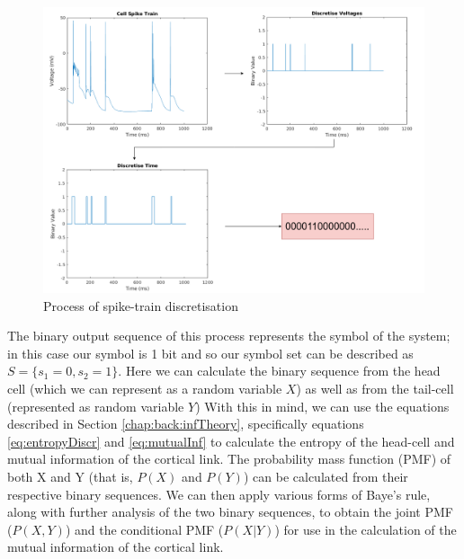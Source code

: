 \begin{figure}[ht]
    \centering
    \includegraphics[width=\textwidth]{04-Methodology/descrTrain.png}
    \caption{Process of spike-train discretisation}
    \label{fig:discrTrain}
\end{figure}
The binary output sequence of this process represents the symbol of the system; in this case our symbol is 1 bit and so our symbol set can be described as $S=\{s_{1}=0, s_{2}=1\}$. Here we can calculate the binary sequence from the head cell (which we can represent as a random variable $X$) as well as from the tail-cell (represented as random variable $Y$) With this in mind, we can use the equations described in Section \ref{chap:back:infTheory}, specifically equations \ref{eq:entropyDiscr} and \ref{eq:mutualInf} to calculate the entropy of the head-cell and mutual information of the cortical link. The probability mass function (PMF) of both X and Y (that is, $P(X)$ and $P(Y)$) can be calculated from their respective binary sequences. We can then apply various forms of Baye's rule, along with further analysis of the two binary sequences, to obtain the joint PMF ($P(X,Y)$) and the conditional PMF ($P(X|Y)$) for use in the calculation of the mutual information of the cortical link.

